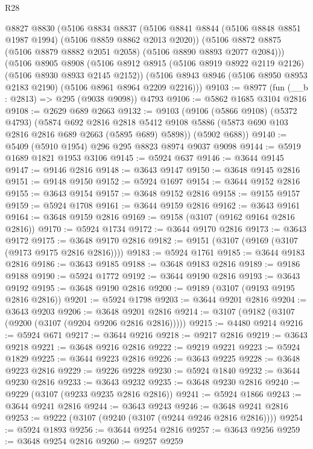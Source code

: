 \begin{lexlean}{R28}
\begin{coremodule}
    @8827
    @8830
    (@5106
      @8834
      @8837
      (@5106 @8841 @8844 (@5106 @8848 @8851 @1987 @1994) (@5106 @8859 @8862 @2013 @2020))
      (@5106 @8872 @8875 (@5106 @8879 @8882 @2051 @2058) (@5106 @8890 @8893 @2077 @2084)))
    (@5106
      @8905
      @8908
      (@5106 @8912 @8915 (@5106 @8919 @8922 @2119 @2126) (@5106 @8930 @8933 @2145 @2152))
      (@5106 @8943 @8946 (@5106 @8950 @8953 @2183 @2190) (@5106 @8961 @8964 @2209 @2216)))
@9103 := @8977 (fun (__b : @2813) => @295 (@9038 @9098)) @4793
@9106 := @5862 @1685 @3104 @2816
@9108 := @2629 @689 @2663
@9132 := @9103
    (@9106
      (@5866 @9108)
      (@5372 @4793)
      (@5874
        @692
        @2816
        @2818
        @5412
        @9108
        @5886
        (@5873 @690 @103 @2816 @2816 @689 @2663 (@5895 @689) @5898))
      (@5902 @688))
@9140 := @5409 (@5910 @1954) @296 @295 @8823 @8974 @9037 @9098
@9144 := @5919 @1689 @1821 @1953 @3106
@9145 := @5924 @637
@9146 := @3644 @9145
@9147 := @9146 @2816
@9148 := @3643 @9147
@9150 := @3648 @9145 @2816
@9151 := @9148 @9150
@9152 := @5924 @1697
@9154 := @3644 @9152 @2816
@9155 := @3643 @9154
@9157 := @3648 @9152 @2816
@9158 := @9155 @9157
@9159 := @5924 @1708
@9161 := @3644 @9159 @2816
@9162 := @3643 @9161
@9164 := @3648 @9159 @2816
@9169 := @9158 (@3107 (@9162 @9164 @2816 @2816))
@9170 := @5924 @1734
@9172 := @3644 @9170 @2816
@9173 := @3643 @9172
@9175 := @3648 @9170 @2816
@9182 := @9151 (@3107 (@9169 (@3107 (@9173 @9175 @2816 @2816))))
@9183 := @5924 @1761
@9185 := @3644 @9183 @2816
@9186 := @3643 @9185
@9188 := @3648 @9183 @2816
@9189 := @9186 @9188
@9190 := @5924 @1772
@9192 := @3644 @9190 @2816
@9193 := @3643 @9192
@9195 := @3648 @9190 @2816
@9200 := @9189 (@3107 (@9193 @9195 @2816 @2816))
@9201 := @5924 @1798
@9203 := @3644 @9201 @2816
@9204 := @3643 @9203
@9206 := @3648 @9201 @2816
@9214 := @3107 (@9182 (@3107 (@9200 (@3107 (@9204 @9206 @2816 @2816)))))
@9215 := @4480 @9214
@9216 := @5924 @671
@9217 := @3644 @9216
@9218 := @9217 @2816
@9219 := @3643 @9218
@9221 := @3648 @9216 @2816
@9222 := @9219 @9221
@9223 := @5924 @1829
@9225 := @3644 @9223 @2816
@9226 := @3643 @9225
@9228 := @3648 @9223 @2816
@9229 := @9226 @9228
@9230 := @5924 @1840
@9232 := @3644 @9230 @2816
@9233 := @3643 @9232
@9235 := @3648 @9230 @2816
@9240 := @9229 (@3107 (@9233 @9235 @2816 @2816))
@9241 := @5924 @1866
@9243 := @3644 @9241 @2816
@9244 := @3643 @9243
@9246 := @3648 @9241 @2816
@9253 := @9222 (@3107 (@9240 (@3107 (@9244 @9246 @2816 @2816))))
@9254 := @5924 @1893
@9256 := @3644 @9254 @2816
@9257 := @3643 @9256
@9259 := @3648 @9254 @2816
@9260 := @9257 @9259

\end{coremodule}
\end{lexlean}
